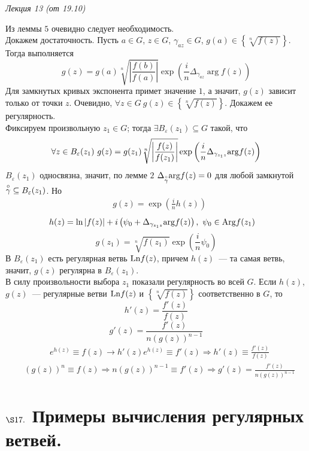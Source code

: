 \begin{flushright}
    \textit{Лекция 13 (от 19.10)}
\end{flushright}
\pr
Из леммы $5$ очевидно следует необходимость.
\\
Докажем достаточность. Пусть $a \in G$, $z \in G$, $\gamma_{az}\in G$, $g(a) \in
\left\{ \sqrt[n]{f(z)} \right\}$. Тогда выполняется
\begin{equation}\label{(16.16)}
    g(z) = g(a) \sqrt[n]{\left| \frac{f(b)}{f(a)} \right|}\exp \left( \frac{i}{n} \Delta_{\gamma_{az}}\arg f(z) \right)
\end{equation}
Для замкнутых кривых экспонента примет значение $1$, а значит, $g(z)$ зависит
только от точки $z$. Очевидно, $\forall z \in G \ g(z)\in \left\{ \sqrt[n]{f(z)}
\right\}$. Докажем ее регулярность.
\\
Фиксируем произвольную $z_1 \in G$; тогда $\exists B_\varepsilon(z_1) \subseteq G$
такой, что
\begin{equation}\label{(16.17)}
    \forall z \in B_\varepsilon(z_1) \ g(z) = g(z_1) \sqrt[n]{\left| \frac{f(z)}{f(z_1)} \right|}\exp \left( \frac{i}{n} \Delta_{\gamma_{z_1z}}\mathrm{arg} f(z) \right)
\end{equation}
$B_{\varepsilon}(z_1)$ односвязна, значит, по лемме $2$
$\Delta_{\overset{\circ}{\gamma}}\mathrm{arg} f(z) = 0$ для любой замкнутой
$\overset{\circ}{\gamma} \subseteq B_\varepsilon(z_1)$. Но
\begin{align*}
  & g(z) = \exp \left( \frac{i}{n} h(z) \right)
\end{align*}
\begin{align*}
  & h(z) = \ln \left| f(z) \right| + i \left(\psi_0 + \Delta_{\gamma_{z_1z}}\mathrm{arg} f(z)\right), \ \psi_0 \in \mathrm{Arg} f(z_1)
\end{align*}
\begin{equation}\label{(16.18)}
    g(z_1) = \sqrt[n]{f(z_1)} \exp\left( \frac{i}{n}\psi_0 \right)
\end{equation}
В $B_\varepsilon(z_1)$ есть регулярная ветвь $\mathrm{Ln} f(z)$, причем $h(z)$~--- та
самая ветвь, значит, $g(z)$ регулярна в $B_\varepsilon(z_1)$.
\\
В силу произвольности выбора $z_1$ показали регулярность во всей $G$.
\corollary
Если $h(z)$, $g(z)$~--- регулярные ветви $\mathrm{Ln} f(z)$ и $\left\{ \sqrt[n]{f(z)}
\right\}$ соответственно в $G$, то
\begin{equation}\label{(16.19)}
    h'(z) = \frac{f'(z)}{f(z)}
\end{equation}
\begin{equation}\label{(16.20)}
    g'(z) = \frac{f'(z)}{n\left( g(z) \right)^{n-1}}
\end{equation}
\pr
\begin{align*}
  & e^{h(z)} \equiv f(z) \rightarrow h'(z)e^{h(z)} \equiv f'(z) \Rightarrow h'(z) \equiv \frac{f'(z)}{f(z)}
\end{align*}
\begin{align*}
  & (g(z))^n \equiv f(z) \Rightarrow n(g(z))^{n-1} \equiv f'(z) \Rightarrow g'(z) = \frac{f'(z)}{n\left( g(z) \right)^{n-1}}
\end{align*}
\section{$\S 17.$ Примеры вычисления регулярных ветвей.}
